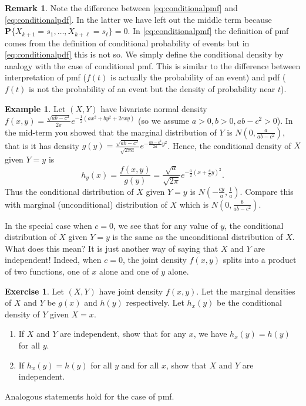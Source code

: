 \documentclass[preprint,  11pt]{amsart}
\theoremstyle{plain} %
\theoremstyle{definition} %
\newtheorem{exercise}[theorem]{Exercise}
\newtheorem{remark}[theorem]{Remark}
\newtheorem{example}[theorem]{Example}
\begin{document}
{\begin{remark} Note the difference between \eqref{eq:conditionalpmf} and \eqref{eq:conditionalpdf}. In the latter we have left out the middle term because $\mathbf{P}\{X_{k+1}=s_{1},\ldots ,X_{k+\ell}=s_{\ell}\}=0$. In \eqref{eq:conditionalpmf} the definition of pmf comes from the definition of conditional probability of events but in \eqref{eq:conditionalpdf} this is not so. We simply define the conditional density by analogy with the case of conditional pmf.  This is similar to the difference between interpretation of pmf ($f(t)$ is actually the probability of an event) and pdf ($f(t)$ is not the probability of an event but the density of probability near $t$).
\end{remark}

\begin{example} Let $(X,Y)$ have bivariate normal density $f(x,y)=\frac{\sqrt{ab-c^{2}}}{2\pi}e^{-\frac{1}{2}(ax^{2}+by^{2}+2cxy)}$ (so we assume $a>0,b>0, ab-c^{2}>0$). In the mid-term you showed that the marginal distribution of $Y$ is $N(0,\frac{a}{ab-c^{2}})$, that is it has density $g(y)=\frac{\sqrt{ab-c^{2}}}{\sqrt{2\pi a}}e^{-\frac{ab-c^{2}}{2a}y^{2}}$. Hence, the conditional density of $X$ given $Y=y$ is 
$$
h_{y}(x)=\frac{f(x,y)}{g(y)} =\frac{\sqrt{a}}{\sqrt{2\pi}}e^{-\frac{a}{2}(x+\frac{c}{a}y)^{2}}.
$$
Thus the conditional distribution of $X$ given $Y=y$ is $N(-\frac{cy}{a},\frac{1}{a})$. Compare this with marginal (unconditional) distribution of $X$ which is $N(0,\frac{b}{ab-c^{2}})$. 

In the special case when $c=0$, we see that for any value of $y$, the conditional distribution of $X$ given $Y=y$ is the same as the unconditional distribution of $X$. What does this mean? It is just another way of saying that $X$ and $Y$ are independent! Indeed, when $c=0$, the joint density $f(x,y)$ splits into a product of two functions, one of $x$ alone and one of $y$ alone.
\end{example}

\begin{exercise} Let $(X,Y)$ have joint density $f(x,y)$. Let the marginal densities of $X$ and $Y$ be $g(x)$ and $h(y)$ respectively. Let $h_{x}(y)$ be the conditional density of $Y$ given $X=x$. 
\begin{enumerate}\setlength\itemsep{6pt}
\item If $X$ and $Y$ are independent, show that for any $x$, we have $h_{x}(y)=h(y)$ for all $y$.
\item If $h_{x}(y)=h(y)$ for all $y$ and for all $x$, show that $X$ and $Y$ are independent.
\end{enumerate}
Analogous statements hold for the case of pmf.
\end{exercise}
}
\end{document}
